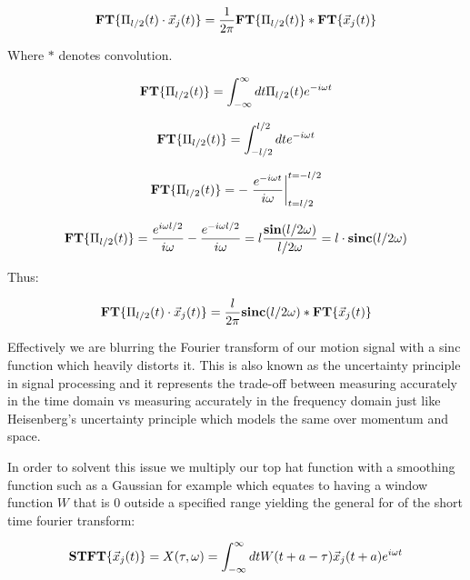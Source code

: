 \documentclass[10pt]{article}
\begin{document}
\begin{equation*}
\bold{FT}\{\Pi_{l/2}(t) \cdot\vec{x}_{j}(t)\} = \frac{1}{2\pi}\bold{FT}\{\Pi_{l/2}(t)\} * \bold{FT}\{\vec{x}_{j}(t) \}
\end{equation*}

Where $*$ denotes convolution.

\begin{equation*}
\bold{FT}\{\Pi_{l/2}(t)\} = \int_{-\infty}^{\infty}dt\Pi_{l/2}(t) e^{-i\omega t}
\end{equation*}

\begin{equation*}
\bold{FT}\{\Pi_{l/2}(t)\} = \int_{-l/2}^{l/2}dt e^{-i\omega t}
\end{equation*}

\begin{equation*}
\bold{FT}\{\Pi_{l/2}(t)\} = -\left.\frac{e^{-i\omega t}}{i\omega} \right|_{t=l/2}^{t=-l/2}
\end{equation*}

\begin{equation*}
\bold{FT}\{\Pi_{l/2}(t)\} = \frac{e^{i\omega l/2}}{i\omega}-\frac{e^{-i\omega l/2}}{i\omega} = l\frac{\bold{sin}(l/2 \omega) }{l/2 \omega} = l \cdot \bold{sinc}(l/2 \omega)
\end{equation*}

Thus:

\begin{equation*}
\bold{FT}\{\Pi_{l/2}(t) \cdot\vec{x}_{j}(t)\} = \frac{l}{2\pi} \bold{sinc}(l/2 \omega) * \bold{FT}\{\vec{x}_{j}(t) \}
\end{equation*}

Effectively  we are blurring the Fourier transform of our motion signal with a sinc function which heavily distorts it. This is also known as the uncertainty principle in signal processing and it represents the trade-off between measuring accurately in the time domain vs measuring accurately in the frequency domain just like Heisenberg's uncertainty principle which models the same over momentum and space.

In order to solvent this issue we multiply our top hat function with a smoothing function such as a Gaussian for example which equates to having a window function $W$ that is 0 outside a specified range yielding the general for of the short time fourier transform:


\begin{equation*}
\bold{STFT}\{\vec{x}_{j}(t)\} = X(\tau, \omega) = \int_{-\infty}^{\infty}dtW(t + a-\tau)\vec{x}_{j}(t + a)e^{i\omega t} 
\end{equation*}
\end{document}
